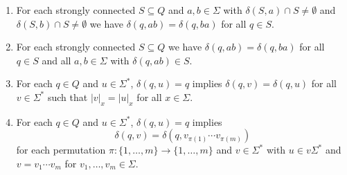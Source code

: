 \begin{theorem}
\begin{enumerate}
\item \label{prelim:prop:solvable-SCC:3} For each strongly connected $S \subseteq Q$
and $a,b \in \Sigma$ with $\delta(S, a) \cap S \ne \emptyset$
and $\delta(S, b) \cap S \ne \emptyset$ we have $\delta(q, ab) = \delta(q, ba)$ for all $q \in S$.

\item \label{prelim:prop:solvable-SCC:4} For each strongly connected $S \subseteq Q$
we have $\delta(q, ab) = \delta(q, ba)$
for all $q \in S$ and all $a,b \in \Sigma$ with $\delta(q, ab) \in S$.

\item \label{prelim:prop:solvable-SCC:3b} For each $q \in Q$ and $u \in \Sigma^*$, $\delta(q,u) = q$
 implies $\delta(q, v) = \delta(q, u)$ for all $v \in \Sigma^*$
 such that $|v|_x = |u|_x$ for all $x \in \Sigma$. 
 
\item \label{prelim:prop:solvable-SCC:3c} For each $q \in Q$ and $u \in \Sigma^*$, $\delta(q,u) = q$
implies
\[
\delta(q, v) = \delta(q, v_{\pi(1)} \cdots v_{\pi(m)})
\]
for each permutation $\pi\colon \{1,\ldots,m\} \to \{1,\ldots,m\}$ 
and $v \in \Sigma^*$ with $u \in v\Sigma^*$
and $v = v_1\cdots v_m$ for $v_1, \ldots, v_m \in \Sigma$.
\end{enumerate}
\end{theorem}
